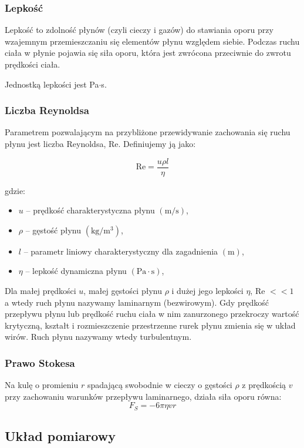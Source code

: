 \documentclass[a4paper]{article}
\newlength{\du}
\begin{document}
\subsubsection{Lepkość}

Lepkość to zdolność płynów (czyli cieczy i gazów) do stawiania oporu przy wzajemnym przemieszczaniu się elementów płynu względem siebie.
Podczas ruchu ciała w płynie pojawia się siła oporu, która jest zwrócona przeciwnie do zwrotu prędkości ciała.

Jednostką lepkości jest Pa$\cdot$s.

\subsubsection{Liczba Reynoldsa}

Parametrem pozwalającym na przybliżone przewidywanie zachowania się
ruchu płynu jest liczba Reynoldsa, Re. Definiujemy ją jako:

 \[ \text{Re} = \frac{u \rho l}{\eta} \]

gdzie:
\begin{itemize}
	\item $u$ -- prędkość charakterystyczna płynu $(\text{m}/\text{s})$,
    \item $\rho$ -- gęstość płynu $(\text{kg}/\text{m}^3)$,
    \item $l$ -- parametr liniowy charakterystyczny dla zagadnienia $(\text{m})$,
	\item $\eta$ -- lepkość dynamiczna płynu $(\text{Pa} \cdot \text{s})$,
\end{itemize}

Dla małej prędkości $u$, małej gęstości płynu $\rho$ i dużej jego lepkości $\eta$, Re $<< 1$ a wtedy ruch
płynu nazywamy laminarnym (bezwirowym). Gdy prędkość przepływu płynu lub prędkość ruchu
ciała w nim zanurzonego przekroczy wartość krytyczną, kształt i rozmieszczenie przestrzenne rurek
płynu zmienia się w układ wirów. Ruch płynu nazywamy wtedy turbulentnym.


\subsubsection{Prawo Stokesa}

Na kulę o promieniu $r$ spadającą swobodnie w cieczy o gęstości $\rho$ z prędkością $v$
przy zachowaniu warunków przepływu laminarnego, działa siła oporu równa:
\[ F_S = - 6\pi \eta v r \]

\subsection{Układ pomiarowy}
\end{document}
